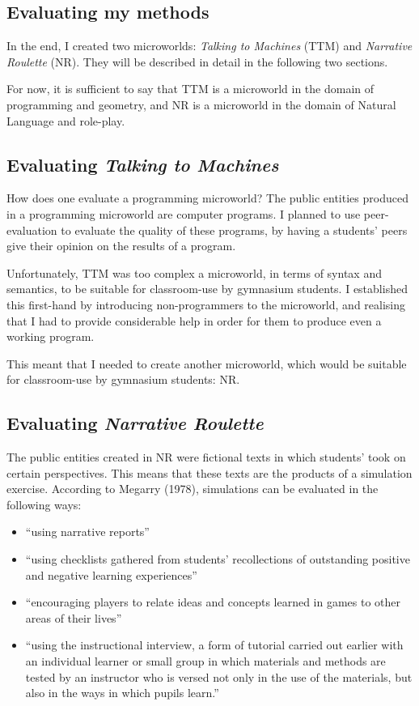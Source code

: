 \subsection{Evaluating my methods}

In the end, I created two microworlds: \textit{Talking to Machines} (TTM) and \textit{Narrative Roulette} (NR). They will be described in detail in the following two sections. 

For now, it is sufficient to say that TTM is a microworld in the domain of programming and geometry, and NR is a microworld in the domain of Natural Language and role-play.

\subsection{Evaluating \textit{Talking to Machines}}

How does one evaluate a programming microworld? The public entities produced in a programming microworld are computer programs. I planned to use peer-evaluation to evaluate the quality of these programs, by having a students' peers give their opinion on the results of a program.

Unfortunately, TTM was too complex a microworld, in terms of syntax and semantics, to be suitable for classroom-use by gymnasium students. I established this first-hand by introducing non-programmers to the microworld, and realising that I had to provide considerable help in order for them to produce even a working program.

This meant that I needed to create another microworld, which would be suitable for classroom-use by gymnasium students: NR.

\subsection{Evaluating \textit{Narrative Roulette}}

The public entities created in NR were fictional texts in which students' took on certain perspectives. This means that these texts are the products of a simulation exercise. According to Megarry (1978)\cite[p187-207]{megarry}, simulations can be evaluated in the following ways:

\begin{itemize} 
  \item ``using narrative reports''
  \item ``using checklists gathered from students' recollections of outstanding positive and negative learning experiences''
  \item ``encouraging players to relate ideas and concepts learned in games to other areas of their lives''
  \item ``using the instructional interview, a form of tutorial carried out earlier with an individual learner or small group in which materials and methods are tested by an instructor who is versed not only in the use of the materials, but also in the ways in which pupils learn.''
\end{itemize}


